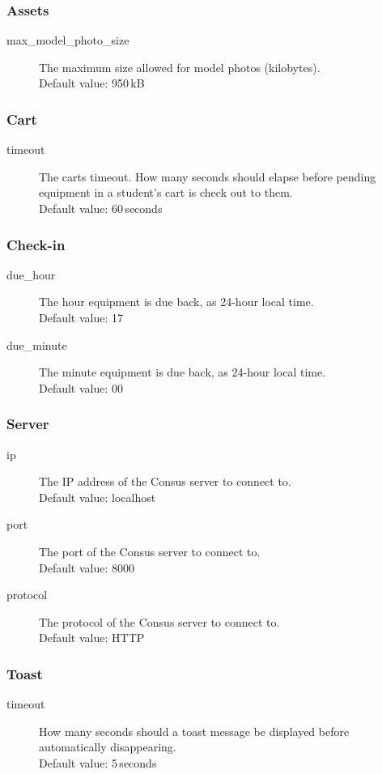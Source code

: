 \subsubsection{Assets}
\label{subsubsec:client_config_assets}

\begin{description}
  \item[max\_model\_photo\_size] The maximum size allowed for model photos (kilobytes).\\
    Default value: 950\,kB
\end{description}

\subsubsection{Cart}
\label{subsubsec:client_config_cart}

\begin{description}
  \item[timeout] The carts timeout.
    How many seconds should elapse before pending equipment in a student's cart is check out to them.\\
    Default value: 60\,seconds
\end{description}

\subsubsection{Check-in}
\label{subsubsec:client_config_checkin}

\begin{description}
  \item[due\_hour] The hour equipment is due back, as 24-hour local time.\\
    Default value: 17
  \item[due\_minute] The minute equipment is due back, as 24-hour local time.\\
    Default value: 00
\end{description}

\subsubsection{Server}
\label{subsubsec:client_config_server}

\begin{description}
  \item[ip] The IP address of the Consus server to connect to.\\
    Default value: localhost
  \item[port] The port of the Consus server to connect to.\\
    Default value: 8000
  \item[protocol] The protocol of the Consus server to connect to.\\
    Default value: HTTP
\end{description}

\subsubsection{Toast}
\label{subsubsec:client_config_toast}

\begin{description}
  \item[timeout] How many seconds should a toast message be displayed before automatically disappearing.\\
    Default value: 5\,seconds
\end{description}

